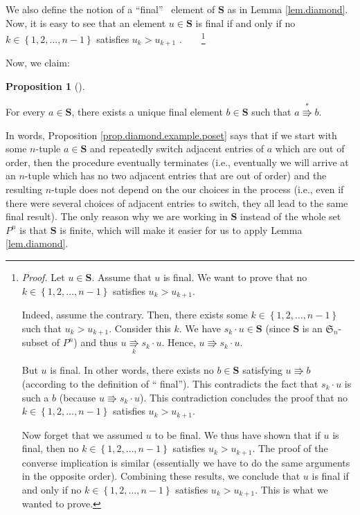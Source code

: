 \documentclass[numbers=enddot,12pt,final,onecolumn,notitlepage]{scrartcl}%
\theoremstyle{definition}
\newtheorem{prop}[theo]{Proposition}
\newenvironment{proposition}[1][]
{\begin{prop}[#1]\begin{leftbar}}
{\end{leftbar}\end{prop}}
\begin{document}
We also define the notion of a \textquotedblleft final\textquotedblright%
\ element of $\mathbf{S}$ as in Lemma \ref{lem.diamond}. Now, it is easy to
see that an element $u\in\mathbf{S}$ is final if and only if no $k\in\left\{
1,2,\ldots,n-1\right\}  $ satisfies $u_{k}>u_{k+1}$%
.\ \ \ \ \footnote{\textit{Proof.} Let $u\in\mathbf{S}$. Assume that $u$ is
final. We want to prove that no $k\in\left\{  1,2,\ldots,n-1\right\}  $
satisfies $u_{k}>u_{k+1}$.
\par
Indeed, assume the contrary. Then, there exists some $k\in\left\{
1,2,\ldots,n-1\right\}  $ such that $u_{k}>u_{k+1}$. Consider this $k$. We
have $s_{k}\cdot u\in\mathbf{S}$ (since $\mathbf{S}$ is an $\mathfrak{S}_{n}%
$-subset of $P^{n}$) and thus $u\underset{k}{\Rrightarrow}s_{k}\cdot u$.
Hence, $u\Rrightarrow s_{k}\cdot u$.
\par
But $u$ is final. In other words, there exists no $b\in\mathbf{S}$ satisfying
$u\Rrightarrow b$ (according to the definition of \textquotedblleft
final\textquotedblright). This contradicts the fact that $s_{k}\cdot u$ is
such a $b$ (because $u\Rrightarrow s_{k}\cdot u$). This contradiction
concludes the proof that no $k\in\left\{  1,2,\ldots,n-1\right\}  $ satisfies
$u_{k}>u_{k+1}$.
\par
Now forget that we assumed $u$ to be final. We thus have shown that if $u$ is
final, then no $k\in\left\{  1,2,\ldots,n-1\right\}  $ satisfies
$u_{k}>u_{k+1}$. The proof of the converse implication is similar (essentially
we have to do the same arguments in the opposite order). Combining these
results, we conclude that $u$ is final if and only if no $k\in\left\{
1,2,\ldots,n-1\right\}  $ satisfies $u_{k}>u_{k+1}$. This is what we wanted to
prove.}

Now, we claim:

\begin{proposition}
\label{prop.diamond.example.poset}For every $a\in\mathbf{S}$, there exists a
unique final element $b\in\mathbf{S}$ such that $a\overset{\ast}{\Rrightarrow
}b$.
\end{proposition}

In words, Proposition \ref{prop.diamond.example.poset} says that if we start
with some $n$-tuple $a\in\mathbf{S}$ and repeatedly switch adjacent entries of
$a$ which are out of order, then the procedure eventually terminates (i.e.,
eventually we will arrive at an $n$-tuple which has no two adjacent entries
that are out of order) and the resulting $n$-tuple does not depend on the our
choices in the process (i.e., even if there were several choices of adjacent
entries to switch, they all lead to the same final result). The only reason
why we are working in $\mathbf{S}$ instead of the whole set $P^{n}$ is that
$\mathbf{S}$ is finite, which will make it easier for us to apply Lemma
\ref{lem.diamond}.
\end{document}
